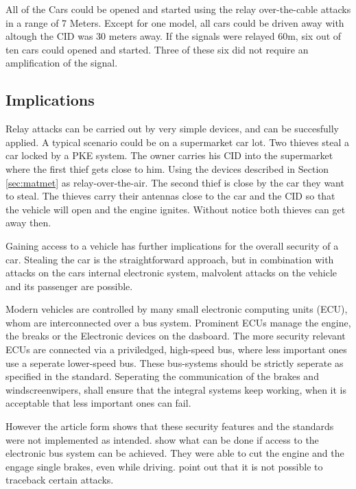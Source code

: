 	All of the Cars could be opened and started using the relay over-the-cable attacks in a range of 7 Meters.
	Except for one model,
	all cars could be driven away with altough the CID was 30 meters away.
	If the signals were relayed 60m,
	six out of ten cars could opened and started.
	Three of these six did not require an amplification of the signal.


\subsection*{Implications}
	\label{sec:attackImplications}
	Relay attacks can be carried out by very simple devices,
	and can be succesfully applied.
	A typical scenario could be on a supermarket car lot.
	Two thieves steal a car locked by a PKE system.
	The owner carries his CID into the supermarket where the first thief gets close to him.
	Using the devices described in Section \ref{sec:matmet} as relay-over-the-air.
	The second thief is close by the car they want to steal.
	The thieves carry their antennas close to the car and the CID so that the vehicle will open
	and the engine ignites.
	Without notice both thieves can get away then.

	Gaining access to a vehicle has further implications for the overall security of a car.
	Stealing the car is the straightforward approach,
	but in combination with attacks on the cars internal electronic system,
	malvolent attacks on the vehicle and its passenger are possible.

	Modern vehicles are controlled by many small electronic computing units (ECU),
	whom are interconnected over a bus system.
	Prominent ECUs manage the engine, the breaks or the Electronic devices on the dasboard.
	The more security relevant ECUs are connected via a priviledged,
	high-speed bus,
	where less important ones use a seperate lower-speed bus.
	These bus-systems should be strictly seperate as specified in the standard. %
	Seperating the communication of the brakes and windscreenwipers,
	shall ensure that the integral systems keep working,
	when it is acceptable that less important ones can fail.

	However the article form \citeauthor{expModernAuto}
	shows that these security features and the standards were not implemented as intended.
	\citeauthor{expModernAuto} show what can be done if access to the electronic bus system can be achieved.
	They were able to cut the engine and the engage single brakes,
	even while driving.
	\citeauthor{expModernAuto} point out that it is not possible to traceback certain attacks.	%

